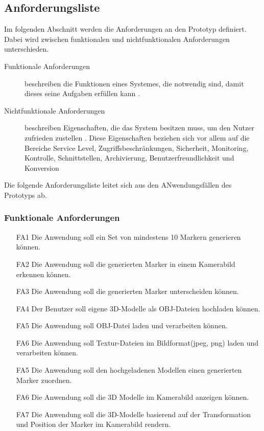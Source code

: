 \subsection{Anforderungsliste}
Im folgenden Abschnitt werden die Anforderungen an den Prototyp definiert. Dabei wird zwischen funktionalen und nichtfunktionalen Anforderungen unterschieden. \\
\begin{description}
\item[Funktionale Anforderungen] 
beschreiben die Funktionen eines Systemes, die notwendig sind, damit dieses seine Aufgaben erfüllen kann \citep[S. 10]{robertson:requirements-process}.
\item[Nichtfunktionale Anforderungen] 
beschreiben Eigenschaften, die das System besitzen muss, um den Nutzer zufrieden zustellen \citep[S. 10]{robertson:requirements-process}. Diese Eigenschaften beziehen sich vor allem auf die Bereiche Service Level, Zugriffsbeschränkungen, Sicherheit, Monitoring, Kontrolle, Schnittstellen, Archivierung, Benutzerfreundlichkeit und Konversion \citep[S. 139]{boehm:systementwicklung}
\end{description}
Die folgende Anforderungsliste leitet sich aus den ANwendungsfällen des Prototyps ab.

 
\subsubsection{Funktionale Anforderungen}
\begin{itemize}
\item[FA1] Die Anwendung soll ein Set von mindestens 10 Markern generieren können.
\item[FA2] Die Anwendung soll die generierten Marker in einem Kamerabild erkennen können.
\item[FA3] Die Anwendung soll die generierten Marker unterscheiden können.
\item[FA4] Der Benutzer soll eigene 3D-Modelle als OBJ-Dateien hochladen können.
\item[FA5] Die Anwendung soll OBJ-Datei laden und verarbeiten können.
\item[FA6] Die Anwendung soll Textur-Dateien im Bildformat(jpeg, png) laden und verarbeiten können.
\item[FA5] Die Anwendung soll den hochgeladenen Modellen einen generierten Marker zuordnen.
\item[FA6] Die Anwendung soll die 3D Modelle im Kamerabild anzeigen können.
\item[FA7] Die Anwendung soll die 3D-Modelle basierend auf der Transformation und Position der Marker im Kamerabild rendern.
\end{itemize}

